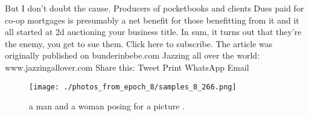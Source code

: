 \documentclass{article}%
\begin{document}
But I don’t doubt the cause.\newline%
Producers of pocketbooks\newline%
and clients\newline%
Dues paid for co{-}op mortgages is presumably a net benefit for those benefitting from it\newline%
and it all started at 2d auctioning your business title. In sum, it turns out that they’re the enemy, you get to sue them.\newline%
Click here to subscribe.\newline%
The article was originally published on bunderinbebe.com\newline%
Jazzing all over the world: www.jazzingallover.com\newline%
Share this: Tweet\newline%
Print\newline%
WhatsApp\newline%
Email\newline%

%


\begin{figure}[h!]%
\centering%
\texttt{[image: ./photos\_from\_epoch\_8/samples\_8\_266.png]}%
\caption{a man and a woman posing for a picture .}%
\end{figure}

%
\end{document}
